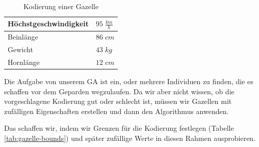             \begin{multicols}{2}
                \hfill \\[-10mm]
                \begin{table}[H]
                    \begin{center}
                    \begin{tabular}{ |l|l| } 
                        \hline
                        Höchstgeschwindigkeit    &$95\; \frac{km}{h}$   \\ \hline
                        Beinlänge                &$86\; cm          $   \\ \hline
                        Gewicht                  &$43\; kg          $   \\ \hline
                        Hornlänge                &$12\; cm          $   \\ \hline
                    \end{tabular}
                    \end{center}
                    \caption{Kodierung einer Gazelle \label{tab:gaz-encoding}}
                \end{table}

                \noindent
                Die Aufgabe von unserem GA ist ein, oder mehrere Individuen zu finden, die es schaffen vor dem Geparden wegzulaufen. Da wir aber nicht wissen, ob die vorgeschlagene Kodierung gut oder schlecht ist, müssen wir Gazellen mit zufälligen Eigenschaften erstellen und dann den Algorithmus anwenden.
            \end{multicols}
            \noindent
            Das schaffen wir, indem wir Grenzen für die Kodierung festlegen (Tabelle \ref{tab:gazelle-bounds}) und später zufällige Werte in diesen Rahmen ausprobieren.

